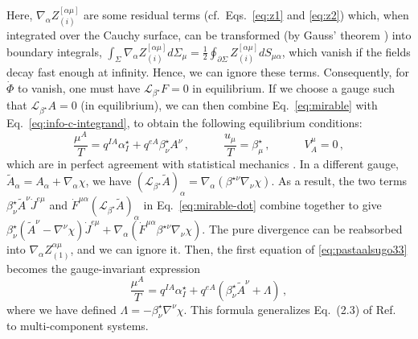 \documentclass[
a4paper,
amsfonts,
amsmath,
reprint,
showkeys,
nofootinbib,
twoside,
onecolumn,
notitlepage
]{revtex4-1}
\newcommand{\spc}{\quad \quad \quad}
\begin{document}
	Here, $\nabla_\alpha Z_{(i)}^{[\alpha \mu]}$ are some residual terms (cf.\ Eqs.\ \eqref{eq:z1} and \eqref{eq:z2}) which, when integrated over the Cauchy surface, can be transformed (by Gauss' theorem \cite{Poisson_notes}) into boundary integrals, $\int_\Sigma \nabla_\alpha Z_{(i)}^{[\alpha \mu]} d\Sigma_\mu =\frac{1}{2} \oint_{\partial \Sigma} Z_{(i)}^{[\alpha \mu]}dS_{\mu \alpha}$, which vanish if the fields decay fast enough at infinity. Hence, we can ignore these terms. 
	Consequently, for $\dot{\Phi}$ to vanish, one must have $\mathcal{L}_{\beta^\star}F=0$ in equilibrium.
 If we choose a gauge such that $\mathcal{L}_{\beta^\star}A=0$ (in equilibrium), we can then combine Eq.\ \eqref{eq:mirable} with Eq.\ \eqref{eq:info-c-integrand}, to obtain the following equilibrium conditions:
	\begin{equation}\label{eq:pastaalsugo33}
		\dfrac{\mu^A}{T}=q^{IA}\alpha^\star_I+q^{eA} \beta^\star_\nu A^\nu \, ,  \spc \dfrac{u_\mu}{T}= \beta^\star_\mu \, , \spc V_A^\mu =0 \, ,
	\end{equation}
	which are in perfect agreement with statistical mechanics \cite{Jensen2013}. 
	In a different gauge, $\tilde{A}_\alpha = A_\alpha +\nabla_\alpha \chi$, we have $(\mathcal{L}_{\beta^\star}\tilde{A})_\alpha=\nabla_\alpha (\beta^{\star \nu}\nabla_\nu \chi)$. 
	As a result, the two terms $\beta^\star_\nu \tilde{A}^\nu \dot{J}^{e\mu}$ and $\dot{F}^{\mu \alpha} (\mathcal{L}_{\beta^\star}\tilde{A})_\alpha$ in Eq.\ \eqref{eq:mirable-dot} combine together to give $\beta^\star_\nu (\tilde{A}^\nu {-}\nabla^\nu \chi) \dot{J}^{e\mu}+\nabla_\alpha (\dot{F}^{\mu \alpha} \beta^{\star \nu}\nabla_\nu \chi)$. 
	The pure divergence can be reabsorbed into $\nabla_\alpha Z_{(1)}^{\alpha \mu}$, and we can ignore it. 
	Then, the first equation of \eqref{eq:pastaalsugo33} becomes the gauge-invariant expression
	\begin{equation}
		\dfrac{\mu^A}{T}=q^{IA}\alpha^\star_I+q^{eA}  (\beta^\star_\nu \tilde{A}^\nu + \Lambda) \, ,
	\end{equation}
	where we have defined $\Lambda=-\beta^\star_\nu \nabla^\nu \chi$. 
	This formula generalizes Eq.\ (2.3) of Ref.\ \cite{HernandezKovtun2017} to multi-component systems.
	
\end{document}
